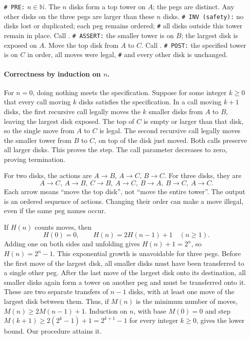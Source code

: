 \begin{algorithm}[H]
\begin{algorithmic}[1]
\Statex \texttt{\# PRE:} $n\in\mathbb N$. The $n$ disks form a top tower on $A$; the pegs are distinct.
Any other disks on the three pegs are larger than these $n$ disks.
\Statex \texttt{\# INV (safety):} no disks lost or duplicated; each peg remains ordered;
\Statex \texttt{\#} all disks outside this tower remain in place.
\State Call .
\Statex \texttt{\# ASSERT:} the smaller tower is on $B$; the largest disk is exposed on $A$.
\State Move the top disk from $A$ to $C$.
\State Call .
\EndIf
\Statex \texttt{\# POST:} the specified tower is on $C$ in order, all moves were legal,
\Statex \texttt{\#} and every other disk is unchanged.
\EndProcedure
\end{algorithmic}
\caption{Move $n$ disks from the first named peg to the last, using the middle peg as spare. \href{https://subhashis-banerjee.in/Courses/QRMT_Monsoon2026/programs/hanoi_graphics.py}{Click here to download a python code that illustrates the solution.}}
\end{algorithm}

\paragraph{Correctness by induction on $n$.}
For $n=0$, doing nothing meets the specification. Suppose for some integer
$k\geq0$ that every call moving $k$ disks satisfies the specification.
In a call moving $k+1$ disks, the first recursive call legally moves the
$k$ smaller disks from $A$ to $B$, leaving the largest disk exposed.
The top of $C$ is empty or larger than that disk, so the single move from
$A$ to $C$ is legal. The second recursive call legally moves the smaller
tower from $B$ to $C$, on top of the disk just moved. Both calls preserve
all larger disks. This proves the step. The call parameter decreases to
zero, proving termination.

For two disks, the actions are $A\to B$, $A\to C$, $B\to C$.
For three disks, they are
\[
A\to C,\ A\to B,\ C\to B,\ A\to C,\ B\to A,\ B\to C,\ A\to C.
\]
Each arrow means ``move the top disk'', not ``move the entire tower''.
The output is an ordered sequence of actions. Changing their order can
make a move illegal, even if the same peg names occur.

If $H(n)$ counts moves, then
\[
H(0)=0,\qquad H(n)=2H(n-1)+1\quad(n\geq1).
\]
Adding one on both sides and unfolding gives $H(n)+1=2^n$, so
$H(n)=2^n-1$. This exponential growth is unavoidable for three pegs.
Before the first move of the largest disk, all smaller disks must have
been transferred to a single other peg. After the last move of the largest
disk onto its destination, all smaller disks again form a tower on another
peg and must be transferred onto it. These are two separate transfers of
$n-1$ disks, with at least one move of the largest disk between them.
Thus, if $M(n)$ is the minimum number of moves,
$M(n)\geq2M(n-1)+1$. Induction on $n$, with base $M(0)=0$ and step
$M(k+1)\geq2(2^k-1)+1=2^{k+1}-1$ for every integer $k\geq0$, gives the
lower bound. Our procedure attains it.

